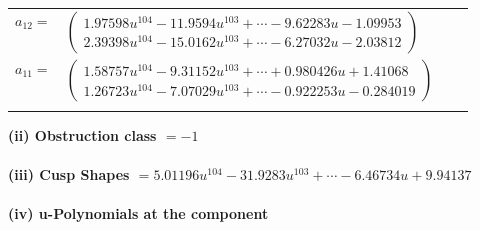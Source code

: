 \documentclass[1p]{elsarticle_modified}
\theoremstyle{definition}
\begin{document}
\begin{tabular}{m{7pt} m{180pt} m{7pt} m{180pt} }
\flushright $a_{12}=$&$\begin{pmatrix}1.97598 u^{104}-11.9594 u^{103}+\cdots-9.62283 u-1.09953\\2.39398 u^{104}-15.0162 u^{103}+\cdots-6.27032 u-2.03812\end{pmatrix}$ \\
\flushright $a_{11}=$&$\begin{pmatrix}1.58757 u^{104}-9.31152 u^{103}+\cdots+0.980426 u+1.41068\\1.26723 u^{104}-7.07029 u^{103}+\cdots-0.922253 u-0.284019\end{pmatrix}$\\&\end{tabular}
\flushleft \textbf{(ii) Obstruction class $= -1$}\\~\\
\flushleft \textbf{(iii) Cusp Shapes $= 5.01196 u^{104}-31.9283 u^{103}+\cdots-6.46734 u+9.94137$}\\~\\
\newpage\renewcommand{\arraystretch}{1}
\flushleft \textbf{(iv) u-Polynomials at the component}\newline \\
\end{document}
